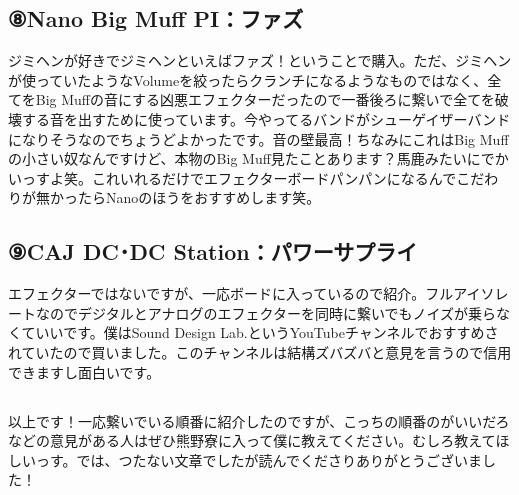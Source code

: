 \subsection{⑧Nano Big Muff PI：ファズ}

ジミヘンが好きでジミヘンといえばファズ！ということで購入。ただ、ジミヘンが使っていたようなVolumeを絞ったらクランチになるようなものではなく、全てをBig Muffの音にする凶悪エフェクターだったので一番後ろに繋いで全てを破壊する音を出すために使っています。今やってるバンドがシューゲイザーバンドになりそうなのでちょうどよかったです。音の壁最高！ちなみにこれはBig Muffの小さい奴なんですけど、本物のBig Muff見たことあります？馬鹿みたいにでかいっすよ笑。これいれるだけでエフェクターボードパンパンになるんでこだわりが無かったらNanoのほうをおすすめします笑。

\subsection{⑨CAJ DC･DC Station：パワーサプライ}

エフェクターではないですが、一応ボードに入っているので紹介。フルアイソレートなのでデジタルとアナログのエフェクターを同時に繋いでもノイズが乗らなくていいです。僕はSound Design Lab.というYouTubeチャンネルでおすすめされていたので買いました。このチャンネルは結構ズバズバと意見を言うので信用できますし面白いです。


\subsection*{}
以上です！一応繋いでいる順番に紹介したのですが、こっちの順番のがいいだろなどの意見がある人はぜひ熊野寮に入って僕に教えてください。むしろ教えてほしいっす。では、つたない文章でしたが読んでくださりありがとうございました！

\subsecdefault
